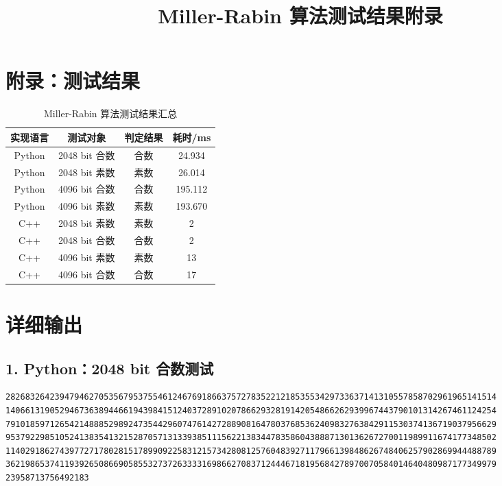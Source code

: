 \documentclass[12pt]{article}
\title{Miller-Rabin 算法测试结果附录}
\author{}
\date{}
\begin{document}
\maketitle

\section*{附录：测试结果}

\begin{table}[htbp]
\centering
\caption{Miller-Rabin 算法测试结果汇总}
\begin{tabular}{cccc}
\toprule
实现语言 & 测试对象 & 判定结果 & 耗时/ms \\
\midrule
Python & 2048 bit 合数 & 合数 & 24.934 \\
Python & 2048 bit 素数 & 素数 & 26.014 \\
Python & 4096 bit 合数 & 合数 & 195.112 \\
Python & 4096 bit 素数 & 素数 & 193.670 \\
C++ & 2048 bit 素数 & 素数 & 2 \\
C++ & 2048 bit 合数 & 合数 & 2 \\
C++ & 4096 bit 素数 & 素数 & 13 \\
C++ & 4096 bit 合数 & 合数 & 17 \\
\bottomrule
\end{tabular}
\end{table}

\clearpage

\section*{详细输出}


\subsection*{1. Python：2048 bit 合数测试}

\begin{lstlisting}[style=numstyle]
2826832642394794627053567953755461246769186637572783522121853553429733637141310557858702961965141514
1406613190529467363894466194398415124037289102078662932819142054866262939967443790101314267461124254
7910185971265421488852989247354429607476142728890816478037685362409832763842911530374136719037956629
9537922985105241383541321528705713133938511156221383447835860438887130136267270011989911674177348502
1140291862743977271780281517899092258312157342808125760483927117966139848626748406257902869944488789
3621986537411939265086690585532737263333169866270837124446718195684278970070584014640480987177349979
23958713756492183
\end{lstlisting}
\end{document}
